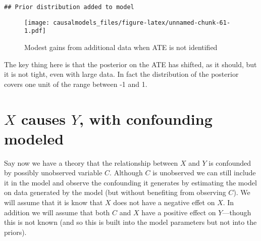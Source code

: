 \documentclass[
  12pt,
]{book}
\newenvironment{Shaded}{\begin{snugshade}}{\end{snugshade}}
\newcommand{\DataTypeTok}[1]{\textcolor[rgb]{0.13,0.29,0.53}{#1}}
\newcommand{\DecValTok}[1]{\textcolor[rgb]{0.00,0.00,0.81}{#1}}
\newcommand{\KeywordTok}[1]{\textcolor[rgb]{0.13,0.29,0.53}{\textbf{#1}}}
\newcommand{\NormalTok}[1]{#1}
\newcommand{\OperatorTok}[1]{\textcolor[rgb]{0.81,0.36,0.00}{\textbf{#1}}}
\newcommand{\StringTok}[1]{\textcolor[rgb]{0.31,0.60,0.02}{#1}}
\begin{document}
\begin{verbatim}
## Prior distribution added to model
\end{verbatim}

\begin{figure}
\centering
\texttt{[image: causalmodels\_files/figure-latex/unnamed-chunk-61-1.pdf]}
\caption{\label{fig:unnamed-chunk-61}Modest gains from additional data when ATE is not identified}
\end{figure}

The key thing here is that the posterior on the ATE has shifted, as it should, but it is not tight, even with large data. In fact the distribution of the posterior covers one unit of the range between -1 and 1.

\hypertarget{x-causes-y-with-confounding-modeled}{%
\section{\texorpdfstring{\(X\) causes \(Y\), with confounding modeled}{X causes Y, with confounding modeled}}\label{x-causes-y-with-confounding-modeled}}

Say now we have a theory that the relationship between \(X\) and \(Y\) is confounded by possibly unobserved variable \(C\). Although \(C\) is unobserved we can still include it in the model and observe the confounding it generates by estimating the model on data generated by the model (but without benefiting from observing \(C\)).
We will assume that it is know that \(X\) does not have a negative effet on \(X\). In addition we will assume that both \(C\) and \(X\) have a positive effect on \(Y\)---though this is not known (and so this is built into the model parameters but not into the priors).

\begin{Shaded}
\end{Shaded}
\end{document}
